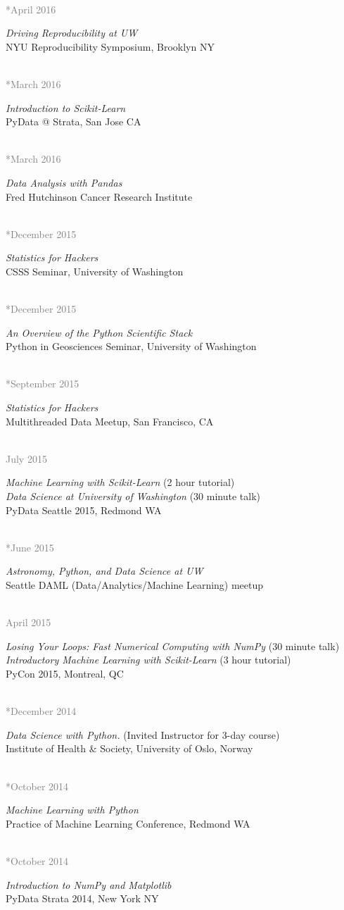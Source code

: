 \documentclass{article} %
\newlength\sidebarwidth
\newcommand{\dateonly}[2][]
	 {\begin{minipage}{\textwidth}
	 \vspace*{.4\baselineskip}
         \nopagebreak\hspace{0in}%
         \nopagebreak\begin{minipage}[t]{\sidebarwidth - .2cm}
         \raggedleft {~}
         {\\[-\baselineskip] \textcolor{gray}{\footnotesize #1}}
	 \end{minipage}%
	 \hfill
	 \begin{minipage}[t]{\linewidth - \sidebarwidth}
	 #2%
	 \end{minipage}%
	 \vspace*{.2\baselineskip plus 1\baselineskip minus
	 .2\baselineskip}%
	 \end{minipage}}
\begin{document}
  \dateonly[**April 2016]{
      {\it Driving Reproducibility at UW}\\
      NYU Reproducibility Symposium, Brooklyn NY
  }

  \dateonly[**March 2016]{
      {\it Introduction to Scikit-Learn}\\
      PyData @ Strata, San Jose CA
  }

  \dateonly[**March 2016]{
      {\it Data Analysis with Pandas}\\
      Fred Hutchinson Cancer Research Institute
  }

  \dateonly[**December 2015]{
      {\it Statistics for Hackers}\\
      CSSS Seminar, University of Washington
  }

  \dateonly[**December 2015]{
      {\it An Overview of the Python Scientific Stack}\\
      Python in Geosciences Seminar, University of Washington
  }

  \dateonly[**September 2015]{
      {\it Statistics for Hackers}\\
      Multithreaded Data Meetup, San Francisco, CA
  }

  \dateonly[July 2015]{
    {\it Machine Learning with Scikit-Learn} (2 hour tutorial)\\
    {\it Data Science at University of Washington} (30 minute talk)\\
    PyData Seattle 2015, Redmond WA
  }

  \dateonly[**June 2015]{
    {\it Astronomy, Python, and Data Science at UW}\\
    Seattle DAML (Data/Analytics/Machine Learning) meetup
  }

  \dateonly[April 2015]{
    {\it Losing Your Loops: Fast Numerical Computing with NumPy} (30 minute talk)\\
    {\it Introductory Machine Learning with Scikit-Learn} (3 hour tutorial)\\
    PyCon 2015, Montreal, QC
  }

  \dateonly[**December 2014]{
    {\it Data Science with Python.} (Invited Instructor for 3-day course)\\
    Institute of Health \& Society, University of Oslo, Norway
  }

  \dateonly[**October 2014]{
    {\it Machine Learning with Python}\\
    Practice of Machine Learning Conference, Redmond WA
  }

  \dateonly[**October 2014]{
    {\it Introduction to NumPy and Matplotlib}\\
    PyData \@ Strata 2014, New York NY
  }
\end{document}
